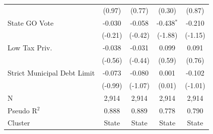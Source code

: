 \begin{tabular*}{\textwidth}{@{\extracolsep{\fill}}lcccc}
                               & (0.97)           & (0.77)               & (0.30)                   & (0.87)\\   
   State GO Vote               & -0.030            & -0.058                & -0.438$^{*}$              & -0.210\\   
                               & (-0.21)          & (-0.42)              & (-1.88)                  & (-1.15)\\   
   Low Tax Priv.               & -0.038            & -0.031                & 0.099                     & 0.091\\   
                               & (-0.56)          & (-0.44)              & (0.59)                   & (0.76)\\   
   Strict Municipal Debt Limit & -0.073            & -0.080                & 0.001                     & -0.102\\   
                               & (-0.99)          & (-1.07)              & (0.01)                   & (-1.01)\\   
   \hline
   N                & 2,914             & 2,914                 & 2,914                     & 2,914\\  
   Pseudo R$^2$                & 0.888             & 0.889                 & 0.778                     & 0.790\\  
   Cluster              & State & State & State & State\\  
   \bottomrule
\end{tabular*}
\par\endgroup
